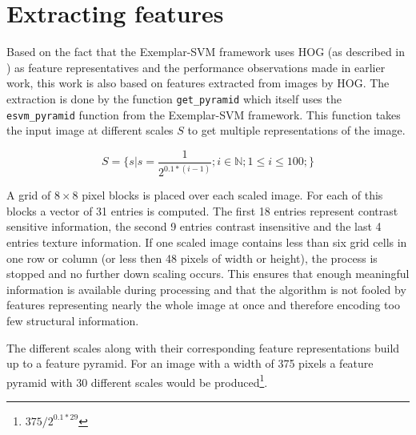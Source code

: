 \section{Extracting features}

Based on the fact that the Exemplar-SVM framework \cite{Malisiewicz2011} uses \ac{HOG} (as described in ) as feature representatives and the performance observations made in earlier work, this work is also based on features extracted from images by \ac{HOG}. The extraction is done by the function \verb|get_pyramid| which itself uses the \verb|esvm_pyramid| function from the Exemplar-SVM framework. This function takes the input image at different scales $S$ to get multiple representations of the image.

\begin{equation}
S = \{s|s = \frac{1}{2^{0.1 * (i-1)}}; i \in \mathbb{N}; 1 \le i \le 100;\}
\end{equation}

A grid of $8\times8$ pixel blocks is placed over each scaled image. For each of this blocks a vector of 31 entries is computed. The first 18 entries represent contrast sensitive information, the second 9 entries contrast insensitive and the last 4 entries texture information. If one scaled image contains less than six grid cells in one row or column (or less then 48 pixels of width or height), the process is stopped and no further down scaling occurs. This ensures that enough meaningful information is available during processing and that the algorithm is not fooled by features representing nearly the whole image at once and therefore encoding too few structural information.
\par
The different scales along with their corresponding feature representations build up to a feature pyramid. For an image with a width of 375 pixels a feature pyramid with 30 different scales would be produced\footnote{$375/2^{0.1 * 29}$}. 

